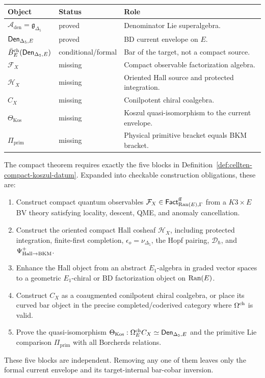 \begin{center}
\begingroup
\small
\begin{tabular}{p{}|p{}|p{}}
\textbf{Object} & \textbf{Status} & \textbf{Role}\\ \hline
\(\mathcal A_{\mathrm{den}}=\mathfrak g_{\Delta_5}\) &
proved &
Denominator Lie superalgebra.\\
\(\mathsf{Den}_{\Delta_5,E}\) &
proved &
BD current envelope on \(E\).\\
\(\bar B_E^{\mathrm{ch}}(\mathsf{Den}_{\Delta_5,E})\) &
conditional/formal &
Bar of the target, not a compact source.\\
\(\mathcal F_X\) &
missing &
Compact observable factorization algebra.\\
\(\mathcal H_X\) &
missing &
Oriented Hall source and protected integration.\\
\(C_X\) &
missing &
Conilpotent chiral coalgebra.\\
\(\Theta_{\mathrm{Kos}}\) &
missing &
Koszul quasi-isomorphism to the current envelope.\\
\(\Pi_{\mathrm{prim}}\) &
missing &
Physical primitive bracket equals BKM bracket.
\end{tabular}
\endgroup
\end{center}

\begin{remark}
\label{rem:cellten-minimal-data}
The compact theorem requires exactly the five blocks in
Definition~\ref{def:cellten-compact-koszul-datum}.  Expanded into
checkable construction obligations, these are:
\begin{enumerate}
\item Construct compact quantum observables
\(\mathcal F_X\in\mathsf{Fact}^{\mathrm{ff}}_{\operatorname{Ran}(E),\Gamma}\) from
a \(K3\times E\) BV theory satisfying locality, descent, QME, and
anomaly cancellation.
\item Construct the oriented compact Hall cosheaf \(\mathcal H_X\),
including protected integration, finite-first completion,
\(\epsilon_o=\nu_{\Delta_5}\), the Hopf pairing, \(\mathcal D_\hbar\),
and \(\Psi^+_{\mathrm{Hall}\to\mathrm{BKM}}\).
\item Enhance the Hall object from an abstract \(E_1\)-algebra in graded
vector spaces to a geometric \(E_1\)-chiral or BD factorization object
on \(\operatorname{Ran}(E)\).
\item Construct \(C_X\) as a coaugmented conilpotent chiral coalgebra,
or place its curved bar object in the precise completed/coderived
category where \(\Omega^{\mathrm{ch}}\) is valid.
\item Prove the quasi-isomorphism
\(\Theta_{\mathrm{Kos}}:\Omega^{\mathrm{ch}}_E C_X\simeq\mathsf{Den}_{\Delta_5,E}\) and the
primitive Lie comparison \(\Pi_{\mathrm{prim}}\) with all Borcherds
relations.
\end{enumerate}
These five blocks are independent.  Removing any one of them leaves only
the formal current envelope and its target-internal bar-cobar inversion.
\end{remark}

